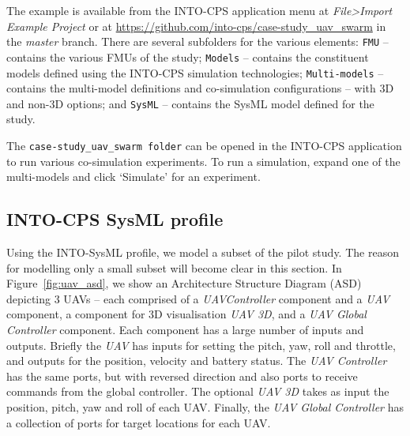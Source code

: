 The example is available from the INTO-CPS application menu at \emph{File>Import Example Project} or at  \url{https://github.com/into-cps/case-study\_uav\_swarm} in the \emph{master} branch. There are several subfolders for the various elements: \texttt{FMU} -- contains the various FMUs of the study; \texttt{Models} -- contains the constituent models defined using the INTO-CPS simulation technologies; \texttt{Multi-models} -- contains the multi-model definitions and co-simulation configurations -- with 3D and non-3D options; and \texttt{SysML} -- contains the SysML model defined for the study.

The \texttt{case-study\_uav\_swarm folder} can be opened in the INTO-CPS application to run various co-simulation experiments. To run a simulation, expand one of the multi-models and click `Simulate' for an experiment. 


\subsection{INTO-CPS SysML profile}
\label{sec:uavswarm_into_sys}

Using the INTO-SysML profile, we model a subset of the pilot study. The reason for modelling only a small subset will become clear in this section. In Figure~\ref{fig:uav_asd}, we show an Architecture Structure Diagram (ASD) depicting 3 UAVs -- each comprised of a \emph{UAVController} component and a \emph{UAV} component, a component for 3D visualisation \emph{UAV 3D}, and a \emph{UAV Global Controller} component. Each component has a large number of inputs and outputs. Briefly the \emph{UAV} has inputs for setting the pitch, yaw, roll and throttle, and outputs for the position, velocity and battery status. The \emph{UAV Controller} has the same ports, but with reversed direction and also ports to receive commands from the global controller. The optional \emph{UAV 3D} takes as input the position, pitch, yaw and roll of each UAV. Finally, the \emph{UAV Global Controller} has a collection of ports for target locations for each UAV. 

